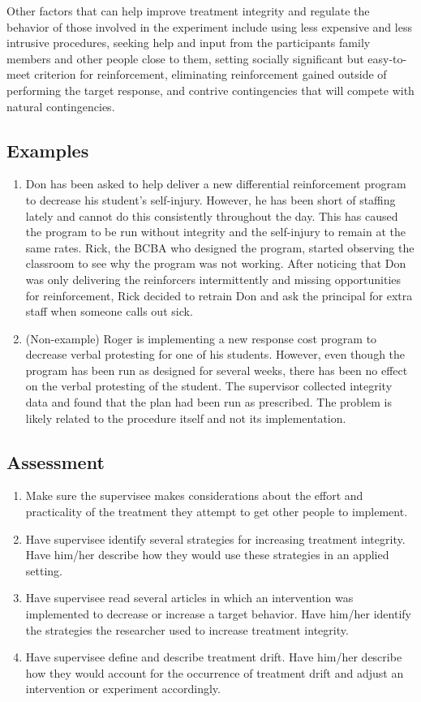 Other factors that can help improve treatment integrity and regulate the behavior of those involved in the experiment include using less expensive and less intrusive procedures, seeking help and input from the participants family members and other people close to them, setting socially significant but easy-to-meet criterion for reinforcement, eliminating reinforcement gained outside of performing the target response, and contrive contingencies that will compete with natural contingencies. 
%
\subsection{Examples}
\begin{enumerate}
\item Don has been asked to help deliver a new differential reinforcement program to decrease his student's self-injury. However, he has been short of staffing lately and cannot do this consistently throughout the day. This has caused the program to be run without integrity and the self-injury to remain at the same rates. Rick, the BCBA who designed the program, started observing the classroom to see why the program was not working. After noticing that Don was only delivering the reinforcers intermittently and missing opportunities for reinforcement, Rick decided to retrain Don and ask the principal for extra staff when someone calls out sick. 
\item (Non-example) Roger is implementing a new response cost program to decrease verbal protesting for one of his students. However, even though the program has been run as designed for several weeks, there has been no effect on the verbal protesting of the student. The supervisor collected integrity data and found that the plan had been run as prescribed. The problem is likely related to the procedure itself and not its implementation.
%
\end{enumerate}
%
\subsection{Assessment}
\begin{enumerate}
\item Make sure the supervisee makes considerations about the effort and practicality of the treatment they attempt to get other people to implement.
\item Have supervisee identify several strategies for increasing treatment integrity. Have him/her describe how they would use these strategies in an applied setting.
\item Have supervisee read several articles in which an intervention was implemented to decrease or increase a target behavior. Have him/her identify the strategies the researcher used to increase treatment integrity.
\item Have supervisee define and describe treatment drift. Have him/her describe how they would account for the occurrence of treatment drift and adjust an intervention or experiment accordingly.
%
\end{enumerate}
%
